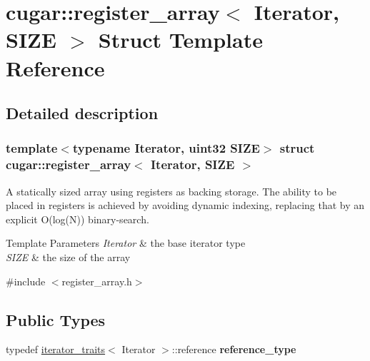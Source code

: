 \hypertarget{structcugar_1_1register__array}{}\section{cugar\+:\+:register\+\_\+array$<$ Iterator, S\+I\+ZE $>$ Struct Template Reference}
\label{structcugar_1_1register__array}


\subsection{Detailed description}
\subsubsection*{template$<$typename Iterator, uint32 S\+I\+ZE$>$\newline
struct cugar\+::register\+\_\+array$<$ Iterator, S\+I\+Z\+E $>$}

A statically sized array using registers as backing storage. The ability to be placed in registers is achieved by avoiding dynamic indexing, replacing that by an explicit O(log(\+N)) binary-\/search.


\begin{DoxyTemplParams}{Template Parameters}
{\em Iterator} & the base iterator type \\
\hline
{\em S\+I\+ZE} & the size of the array \\
\hline
\end{DoxyTemplParams}


{\ttfamily \#include $<$register\+\_\+array.\+h$>$}

\subsection*{Public Types}
\begin{DoxyCompactItemize}
\item 
\mbox{\label{structcugar_1_1register__array_a0802b48da752a89bb1c894ac7a3ef52f}} 
typedef \hyperlink{structcugar_1_1iterator__traits}{iterator\+\_\+traits}$<$ Iterator $>$\+::reference {\bfseries reference\+\_\+type}
\end{DoxyCompactItemize}
